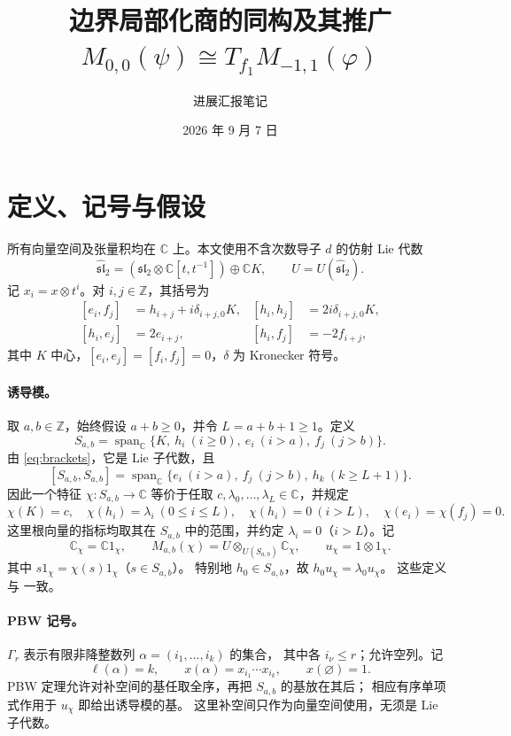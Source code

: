 \documentclass[UTF8,11pt]{ctexart}
\title{边界局部化商的同构及其推广\\
  \large \(M_{0,0}(\psi)\cong T_{f_1}M_{-1,1}(\varphi)\)}
\author{进展汇报笔记}
\date{2026 年 9 月 7 日}
\newcommand{\C}{\mathbb C}
\newcommand{\Z}{\mathbb Z}
\newcommand{\g}{\widehat{\mathfrak{sl}}_2}
\newcommand{\Span}{\operatorname{span}_{\C}}
\theoremstyle{definition}
\begin{document}
\maketitle

\section{定义、记号与假设}

所有向量空间及张量积均在 \(\C\) 上。本文使用不含次数导子 \(d\) 的仿射 Lie 代数
\[
  \g=(\mathfrak{sl}_2\otimes\C[t,t^{-1}])\oplus\C K,\qquad U=U(\g).
\]
记 \(x_i=x\otimes t^i\)。对 \(i,j\in\Z\)，其括号为
\begin{equation}\label{eq:brackets}
\begin{aligned}
 [e_i,f_j]&=h_{i+j}+i\delta_{i+j,0}K,&
 [h_i,h_j]&=2i\delta_{i+j,0}K,\\
 [h_i,e_j]&=2e_{i+j},&
 [h_i,f_j]&=-2f_{i+j},
\end{aligned}
\end{equation}
其中 \(K\) 中心，\([e_i,e_j]=[f_i,f_j]=0\)，\(\delta\) 为 Kronecker 符号。

\paragraph{诱导模。}
取 \(a,b\in\Z\)，始终假设 \(a+b\ge0\)，并令 \(L=a+b+1\ge1\)。定义
\[
 S_{a,b}=\Span\{K,\ h_i\ (i\ge0),\ e_i\ (i>a),\ f_j\ (j>b)\}.
\]
由 \eqref{eq:brackets}，它是 Lie 子代数，且
\[
 [S_{a,b},S_{a,b}]
 =\Span\{e_i\ (i>a),\ f_j\ (j>b),\ h_k\ (k\ge L+1)\}.
\]
因此一个特征 \(\chi:S_{a,b}\to\C\) 等价于任取
\(c,\lambda_0,\ldots,\lambda_L\in\C\)，并规定
\[
 \chi(K)=c,\quad \chi(h_i)=\lambda_i\ (0\le i\le L),\quad
 \chi(h_i)=0\ (i>L),\quad \chi(e_i)=\chi(f_j)=0.
\]
这里根向量的指标均取其在 \(S_{a,b}\) 中的范围，并约定 \(\lambda_i=0\)（\(i>L\)）。记
\[
 \C_\chi=\C 1_\chi,\qquad
 M_{a,b}(\chi)=U\otimes_{U(S_{a,b})}\C_\chi,\qquad u_\chi=1\otimes1_\chi.
\]
其中 \(s1_\chi=\chi(s)1_\chi\)（\(s\in S_{a,b}\)）。
特别地 \(h_0\in S_{a,b}\)，故 \(h_0u_\chi=\lambda_0u_\chi\)。
这些定义与 \cite[\S2.3]{FGXZ} 一致。

\paragraph{PBW 记号。}
\(\Gamma_r\) 表示有限非降整数列 \(\alpha=(i_1,\ldots,i_k)\) 的集合，
其中各 \(i_\nu\le r\)；允许空列。记
\[
 \ell(\alpha)=k,\qquad
 x(\alpha)=x_{i_1}\cdots x_{i_k},\qquad x(\varnothing)=1.
\]
PBW 定理允许对补空间的基任取全序，再把 \(S_{a,b}\) 的基放在其后；
相应有序单项式作用于 \(u_\chi\) 即给出诱导模的基。
这里补空间只作为向量空间使用，无须是 Lie 子代数。
\end{document}
